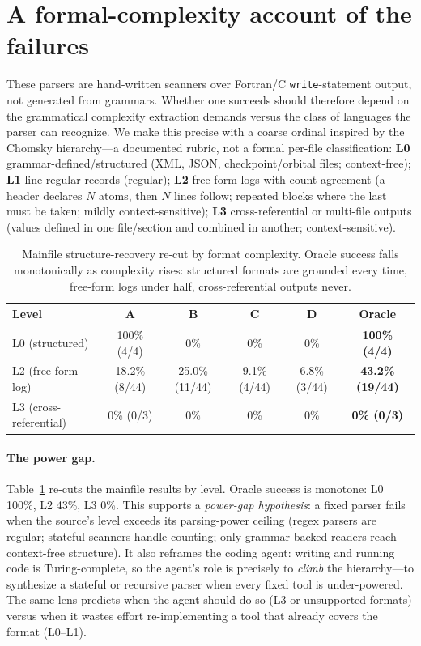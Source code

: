 \documentclass{article}
\begin{document}
\section{A formal-complexity account of the failures}
\label{sec:complexity}

These parsers are hand-written scanners over Fortran/C \texttt{write}-statement
output, not generated from grammars. Whether one succeeds should therefore depend
on the grammatical complexity extraction demands versus the class of languages the
parser can recognize. We make this precise with a coarse ordinal inspired by the
Chomsky hierarchy---a documented rubric, not a formal per-file classification:
\textbf{L0} grammar-defined/structured (XML, JSON, checkpoint/orbital files;
context-free); \textbf{L1} line-regular records (regular); \textbf{L2} free-form
logs with count-agreement (a header declares $N$ atoms, then $N$ lines follow;
repeated blocks where the last must be taken; mildly context-sensitive);
\textbf{L3} cross-referential or multi-file outputs (values defined in one
file/section and combined in another; context-sensitive).

\begin{table}[t]
\centering
\small
\begin{tabular}{lccccc}
\toprule
Level & A & B & C & D & Oracle \\
\midrule
L0 (structured)        & 100\% (4/4)  & 0\%          & 0\%         & 0\%          & \textbf{100\% (4/4)} \\
L2 (free-form log)     & 18.2\% (8/44)& 25.0\% (11/44)& 9.1\% (4/44)& 6.8\% (3/44) & \textbf{43.2\% (19/44)} \\
L3 (cross-referential) & 0\% (0/3)    & 0\%          & 0\%         & 0\%          & \textbf{0\% (0/3)} \\
\bottomrule
\end{tabular}
\caption{Mainfile structure-recovery re-cut by format complexity. Oracle success
falls monotonically as complexity rises: structured formats are grounded every
time, free-form logs under half, cross-referential outputs never.}
\label{tab:complexity}
\end{table}

\paragraph{The power gap.} Table~\ref{tab:complexity} re-cuts the mainfile results
by level. Oracle success is monotone: L0 100\%, L2 43\%, L3 0\%. This supports a
\emph{power-gap hypothesis}: a fixed parser fails when the source's level exceeds
its parsing-power ceiling (regex parsers are regular; stateful scanners handle
counting; only grammar-backed readers reach context-free structure). It also
reframes the coding agent: writing and running code is Turing-complete, so the
agent's role is precisely to \emph{climb} the hierarchy---to synthesize a stateful
or recursive parser when every fixed tool is under-powered. The same lens predicts
when the agent should do so (L3 or unsupported formats) versus when it wastes
effort re-implementing a tool that already covers the format (L0--L1).
\end{document}
